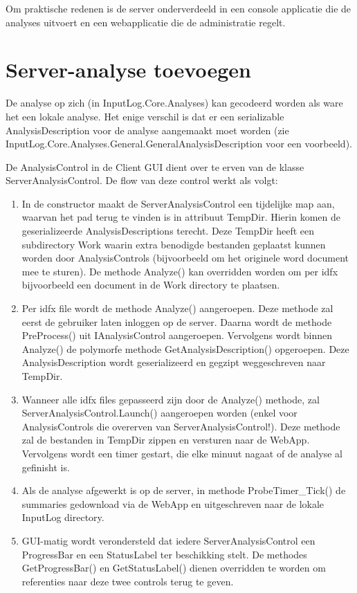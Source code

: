 \documentclass[a4paper,11pt]{report}
\begin{document}
Om praktische redenen is de server onderverdeeld in een console applicatie die de analyses uitvoert en een webapplicatie die de administratie regelt.

\section{Server-analyse toevoegen}
De analyse op zich (in InputLog.Core.Analyses) kan gecodeerd worden als ware het een lokale analyse. Het enige verschil is dat er een serializable AnalysisDescription voor de analyse aangemaakt moet worden (zie InputLog.Core.Analyses.General.GeneralAnalysisDescription voor een voorbeeld).

De AnalysisControl in de Client GUI dient over te erven van de klasse ServerAnalysisControl. De flow van deze control werkt als volgt:
\begin{enumerate}
\item In de constructor maakt de ServerAnalysisControl een tijdelijke map aan, waarvan het pad terug te vinden is in attribuut TempDir. Hierin komen de geserializeerde AnalysisDescriptions terecht. Deze TempDir heeft een subdirectory Work waarin extra benodigde bestanden geplaatst kunnen worden door AnalysisControls (bijvoorbeeld om het originele word document mee te sturen). De methode Analyze() kan overridden worden om per idfx bijvoorbeeld een document in de Work directory te plaatsen.
\item Per idfx file wordt de methode Analyze() aangeroepen. Deze methode zal eerst de gebruiker laten inloggen op de server. Daarna wordt de methode PreProcess() uit IAnalysisControl aangeroepen. Vervolgens wordt binnen Analyze() de polymorfe methode GetAnalysisDescription() opgeroepen. Deze AnalysisDescription wordt geserializeerd en gegzipt weggeschreven naar TempDir.
\item Wanneer alle idfx files gepasseerd zijn door de Analyze() methode, zal ServerAnalysisControl.Launch() aangeroepen worden (enkel voor AnalysisControls die overerven van ServerAnalysisControl!). Deze methode zal de bestanden in TempDir zippen en versturen naar de WebApp. Vervolgens wordt een timer gestart, die elke minuut nagaat of de analyse al gefinisht is.
\item Als de analyse afgewerkt is op de server, in methode ProbeTimer\_Tick() de summaries gedownload via de WebApp en uitgeschreven naar de lokale InputLog directory.
\item GUI-matig wordt verondersteld dat iedere ServerAnalysisControl een ProgressBar en een StatusLabel ter beschikking stelt. De methodes GetProgressBar() en GetStatusLabel() dienen overridden te worden om referenties naar deze twee controls terug te geven.
\end{enumerate} 
\end{document}
